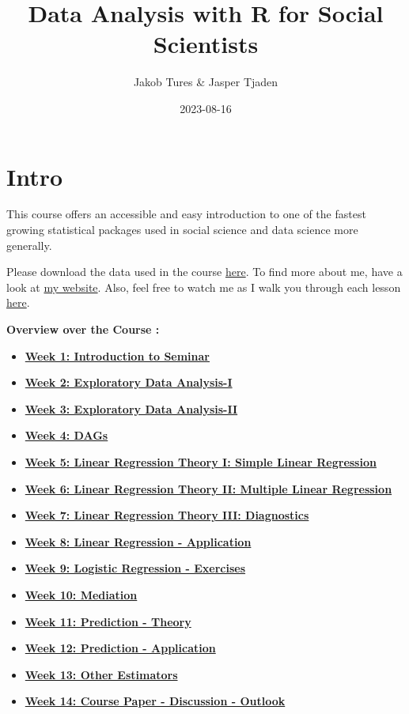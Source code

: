 \documentclass[
]{book}
\title{Data Analysis with R for Social Scientists}
\author{Jakob Tures \& Jasper Tjaden}
\date{2023-08-16}
\providecommand{\tightlist}{%
  \setlength{\itemsep}{0pt}\setlength{\parskip}{0pt}}
\begin{document}
\maketitle

{
\setcounter{tocdepth}{1}
\tableofcontents
}
\hypertarget{intro}{%
\chapter*{Intro}\label{intro}}

This course offers an accessible and easy introduction to one of the fastest growing statistical packages used in social science and data science more generally.

Please download the data used in the course \href{https://www.worldvaluessurvey.org/WVSDocumentationWV7.jsp}{here}. To find more about me, have a look at \href{https://jaspertjaden.com}{my website}. Also, feel free to watch me as I walk you through each lesson \href{https://www.youtube.com/playlist?list=PLr43hk2e3hFMg4tZdJsN0qzG5YkQB3A1c}{here}.

\textbf{Overview over the Course :}

\begin{itemize}
\tightlist
\item
  \textbf{\protect\hyperlink{intro-sem}{Week 1: Introduction to Seminar}}
\item
  \textbf{\protect\hyperlink{eda-1}{Week 2: Exploratory Data Analysis-I}}
\item
  \textbf{\protect\hyperlink{eda-2}{Week 3: Exploratory Data Analysis-II}}
\item
  \textbf{\protect\hyperlink{dags-1}{Week 4: DAGs}}
\item
  \textbf{\protect\hyperlink{lin-t-1}{Week 5: Linear Regression Theory I: Simple Linear Regression}}
\item
  \textbf{\protect\hyperlink{lin-t-2}{Week 6: Linear Regression Theory II: Multiple Linear Regression}}
\item
  \textbf{\protect\hyperlink{lin-t-3}{Week 7: Linear Regression Theory III: Diagnostics}}
\item
  \textbf{\protect\hyperlink{lin-a}{Week 8: Linear Regression - Application}}
\item
  \textbf{\protect\hyperlink{lin-e}{Week 9: Logistic Regression - Exercises}}
\item
  \textbf{\protect\hyperlink{med}{Week 10: Mediation}}
\item
  \textbf{\protect\hyperlink{pm-t}{Week 11: Prediction - Theory}}
\item
  \textbf{\protect\hyperlink{pm-a}{Week 12: Prediction - Application}}
\item
  \textbf{\protect\hyperlink{other-est}{Week 13: Other Estimators}}
\item
  \textbf{\protect\hyperlink{out-look}{Week 14: Course Paper - Discussion - Outlook}}
\end{itemize}
\end{document}
